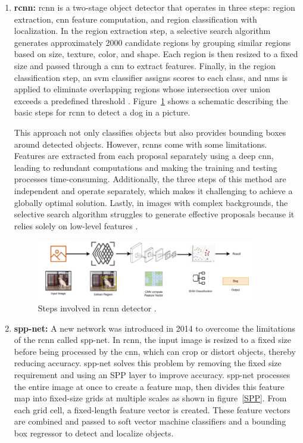\begin{enumerate}
    \item \textbf{\gls{rcnn}:} \gls{rcnn} is a two-stage object detector that operates in three steps: region extraction, \gls{cnn} feature computation, and region classification with localization. In the region extraction step, a selective search algorithm generates approximately 2000 candidate regions by grouping similar regions based on size, texture, color, and shape. Each region is then resized to a fixed size and passed through a \gls{cnn} to extract features. Finally, in the region classification step, an \gls{svm} classifier assigns scores to each class, and \gls{nms} is applied to eliminate overlapping regions whose intersection over union exceeds a predefined threshold \cite{oD_Review}. Figure~\ref{RCNN} shows a schematic describing the basic steps for \gls{rcnn} to detect a dog in a picture.

    This approach not only classifies objects but also provides bounding boxes around detected objects. However, \gls{rcnn}s come with some limitations. Features are extracted from each proposal separately using a deep \gls{cnn}, leading to redundant computations and making the training and testing processes time-consuming. Additionally, the three steps of this method are independent and operate separately, which makes it challenging to achieve a globally optimal solution. Lastly, in images with complex backgrounds, the selective search algorithm struggles to generate effective proposals because it relies solely on low-level features \cite{oD_Review}.
    
    \begin{figure}[!ht]
        \centering
        \includegraphics[width=0.9\textwidth]{Figures/RCNN.PNG} 
        \caption{Steps involved in \gls{rcnn} detector \cite{oD_Review}.}
        \label{RCNN}
    \end{figure}
    
    \item \textbf{\gls{spp-net}:} A new network was introduced in 2014 to overcome the limitations of the \gls{rcnn} called \gls{spp-net}. In \gls{rcnn}, the input image is resized to a fixed size before being processed by the \gls{cnn}, which can crop or distort objects, thereby reducing accuracy. \gls{spp-net} solves this problem by removing the fixed size requirement and using an SPP layer to improve accuracy. \gls{spp-net} processes the entire image at once to create a feature map, then divides this feature map into fixed-size grids at multiple scales as shown in figure~\ref{SPP}. From each grid cell, a fixed-length feature vector is created. These feature vectors are combined and passed to soft vector machine classifiers and a bounding box regressor to detect and localize objects.
    

\end{enumerate}
